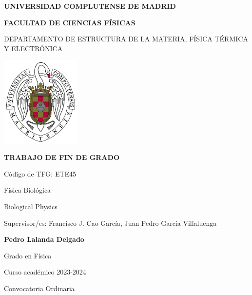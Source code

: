 \documentclass[a4paper,11pt,titlepage]{article}
\theoremstyle{definition}
\begin{document}
\pagestyle{fancy}
\fancyhf{}
\renewcommand*{\bibfont}{\small}
\renewcommand{\headrulewidth}{2pt}
\renewcommand{\footrulewidth}{1pt}
\fancyhf[RF]{\footnotesize{\thepage}}
\setlength\parindent{0pt}
\setlength{\parskip}{3mm}



\begin{titlepage}
\centering
{ \bfseries \Large UNIVERSIDAD COMPLUTENSE DE MADRID}
\vspace{0.5cm}

{\bfseries  \Large FACULTAD DE CIENCIAS FÍSICAS} 
\vspace{1cm}

{\large DEPARTAMENTO DE ESTRUCTURA DE LA MATERIA, FÍSICA TÉRMICA Y ELECTRÓNICA}
\vspace{0.8cm}

{\includegraphics[width=0.3\textwidth]{UCM.png}}

\vspace{0.8cm}


{\bfseries \Large TRABAJO DE FIN DE GRADO}
\vspace{1cm}

{\Large Código de TFG:  ETE45 } \vspace{2mm}

{\Large Física Biológica}\vspace{2mm}

{\Large Biological Physics}\vspace{2mm}

{\Large Supervisor/es: Francisco J. Cao García, Juan Pedro García Villaluenga}\vspace{10mm} 

{\bfseries \LARGE Pedro Lalanda Delgado}\vspace{2mm} 

{\large Grado en Física}\vspace{2mm} 

{\large Curso acad\'emico 2023-2024}\vspace{2mm} 

{\large Convocatoria Ordinaria}\vspace{2mm} 

\end{titlepage}
\newpage
\end{document}
